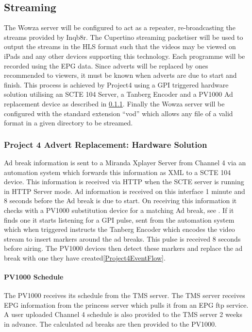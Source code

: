 \subsection{Streaming}
The Wowza server will be configured to act as a repeater, re-broadcasting the streams provided by Inqb8r. The Cupertino streaming packetiser will be used to output the streams in the HLS format such that the videos may be viewed on iPads and any other devices supporting this technology. Each programme will be recorded using the EPG data. Since adverts will be replaced by ones recommended to viewers, it must be known when adverts are due to start and finish. This process is achieved by Project4 using a GPI\citep{SCTE104} triggered hardware solution utilising an SCTE 104 Server, a Tanberg Encoder and a PV1000 Ad replacement device as described in \ref{subsubsec:Project4Tech}. Finally the Wowza server will be configured with the standard extension ``vod'' which allows any file of a valid format in a given directory to be streamed.

\subsubsection{Project 4 Advert Replacement: Hardware Solution}\label{subsubsec:Project4Tech}
Ad break information is sent to a Miranda Xplayer Server from Channel 4 via an automation system which forwards this information as XML to a SCTE 104 device. This information is received via HTTP when the SCTE server is running in HTTP Server mode. Ad information is received on this interface 1 minute and 8 seconds before the Ad break is due to start. On receiving this information it checks with a PV1000 substitution device for a matching Ad break, see \citep{PV1000Schedule}. If it finds one it starts listening for a GPI pulse, sent from the automation system which when triggered instructs the Tanberg Encoder which encodes the video stream to insert markers around the ad breaks. This pulse is received 8 seconds before airing. The PV1000 devices then detect these markers and replace the ad break with one they have created\ref{Project4EventFlow}.

\paragraph{PV1000 Schedule}\label{PV1000Schedule}
The PV1000 receives its schedule from the TMS server. The TMS server receives EPG information from the princess server which pulls it from an EPG ftp service. A user uploaded Channel 4 schedule is also provided to the TMS server 2 weeks in advance. The calculated ad breaks are then provided to the PV1000.

